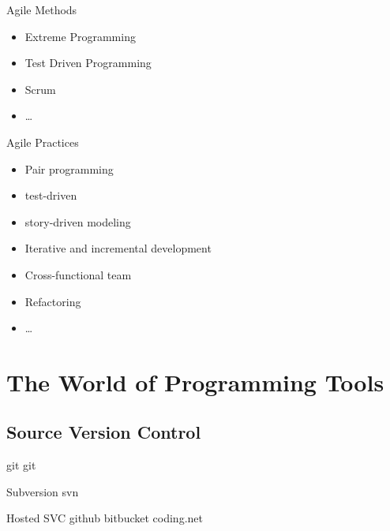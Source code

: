 \documentclass[UTF8]{beamer}
\begin{document}
\begin{frame}
  \begin{block}{Agile Methods}
    \begin{itemize}
      \item Extreme Programming
      \item Test Driven Programming
      \item Scrum
      \item \ldots
    \end{itemize}
  \end{block}
\end{frame}

\begin{frame}
  \begin{block}{Agile Practices}
    \begin{itemize}
      \item Pair programming
      \item test-driven
      \item story-driven modeling
      \item Iterative and incremental development
      \item Cross-functional team
      \item Refactoring
      \item \ldots
    \end{itemize}
  \end{block}
\end{frame}

\section{The World of Programming Tools}

\subsection{Source Version Control}

\begin{frame}[t]{git}
    git
\end{frame}

\begin{frame}[t]{Subversion}
    svn
\end{frame}

\begin{frame}[t]{Hosted SVC}
    github
    bitbucket
    coding.net
\end{frame}
\end{document}
